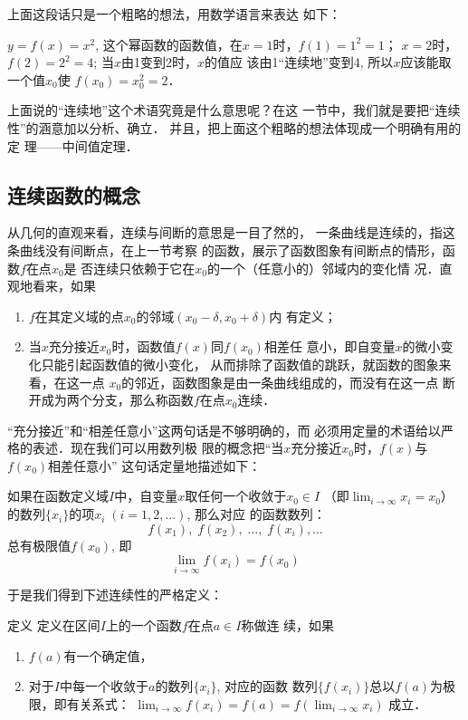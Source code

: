 上面这段话只是一个粗略的想法，用数学语言来表达
如下：

$y=f(x)=x^2$, 这个幂函数的函数值，在$x=1$时，$f(1)=1^2=1$；
$x=2$时，$f(2)=2^2=4$; 当$x$由1变到2时，$x$的值应
该由1“连续地”变到4, 所以$x$应该能取一个值$x_0$使
$f(x_0)=x^2_0=2$．

上面说的“连续地”这个术语究竟是什么意思呢？在这
一节中，我们就是要把“连续性”的涵意加以分析、确立．
并且，把上面这个粗略的想法体现成一个明确有用的定
理——中间值定理．

\subsection{连续函数的概念}
从几何的直观来看，连续与间断的意思是一目了然的，
一条曲线是连续的，指这条曲线没有间断点，在上一节考察
的函数，展示了函数图象有间断点的情形，函数$f$在点$x_0$是
否连续只依赖于它在$x_0$的一个（任意小的）邻域内的变化情
况．直观地看来，如果
\begin{enumerate}
\item $f$在其定义域的点$x_0$的邻域$(x_0-\delta,x_0+\delta)$内
有定义；
\item 当$x$充分接近$x_0$时，函数值$f(x)$同$f(x_0)$相差任
意小，即自变量$x$的微小变化只能引起函数值的微小变化，
从而排除了函数值的跳跃，就函数的图象来看，在这一点
$x_0$的邻近，函数图象是由一条曲线组成的，而没有在这一点
断开成为两个分支，那么称函数$f$在点$x_0$连续．
\end{enumerate}


“充分接近”和“相差任意小”这两句话是不够明确的，而
必须用定量的术语给以严格的表述．现在我们可以用数列极
限的概念把“当$x$充分接近$x_0$时，$f(x)$与$f(x_0)$相差任意小”
这句话定量地描述如下：

如果在函数定义域$I$中，自变量$x$取任何一个收敛于$x_0\in I$
（即$\displaystyle\lim_{i\to\infty}x_i=x_0$）的数列$\{x_i\}$的项$x_i\; (i=1,2,\ldots)$, 那么对应
的函数数列：
\[f(x_1),\; f(x_2),\; \ldots,\;  f(x_i),\ldots\]
总有极限值$f(x_0)$, 即
\[\lim_{i\to\infty} f(x_i)=f(x_0)\]

于是我们得到下述连续性的严格定义：

\begin{blk}{定义}
     定义在区间$I$上的一个函数$f$在点$a\in I$称做连
续，如果
\begin{enumerate}
\item $f(a)$有一个确定值，
\item 对于$I$中每一个收敛于$a$的数列$\{x_i\}$, 对应的函数
数列$\{f(x_i)\}$总以$f(a)$为极限，即有关系式：
$\displaystyle\lim_{i\to \infty}f(x_i)=f(a)=f\left(\displaystyle\lim_{i\to \infty}x_i\right)$
成立．
\end{enumerate}
\end{blk}


